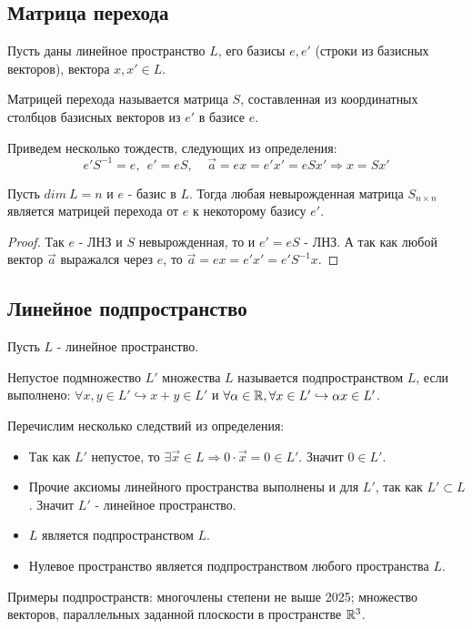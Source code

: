 \subsection{Матрица перехода}
Пусть даны линейное пространство $L$, его базисы $e, e'$ (строки из базисных векторов), вектора $x, x' \in L$.
\begin{definition}
    Матрицей перехода называется матрица $S$, составленная из координатных столбцов базисных векторов из $e'$ в базисе $e$.
\end{definition}
Приведем несколько тождеств, следующих из определения:
\[
    e'S^{-1} =e, \ \ e'=eS, \ \ \ \ \ \vec{a}=ex=e'x'=eSx' \Rightarrow x=Sx' 
\]
\begin{proposition}
    Пусть $dim \ L = n$ и $e$ - базис в $L$. Тогда любая невырожденная матрица $S_{n \times n}$ является матрицей перехода от $e$ к некоторому базису $e'$.
\end{proposition}
\begin{proof}
    Так $e$ - ЛНЗ и $S$ невырожденная, то и $e'=eS$ - ЛНЗ. А так как любой вектор $\vec{a}$ выражался через $e$, то  $\vec{a}=ex=e'x'=e'S^{-1}x$.
\end{proof}
\subsection{Линейное подпространство}
Пусть $L$ - линейное пространство.
\begin{definition}
    Непустое подмножество $L'$ множества $L$ называется подпространством $L$, если выполнено: $\forall x, y \in L' \hookrightarrow x+y\in L'$ и $\forall \alpha \in \mathbb{R}, \forall x \in L' \hookrightarrow \alpha x \in L'$.
\end{definition}
Перечислим несколько следствий из определения:
\begin{itemize}
    \item Так как $L'$ непустое, то $\exists \vec{x}\in L \Rightarrow 0 \cdot \vec{x}=0 \in L'$. Значит $0 \in L'$.
    \item Прочие аксиомы линейного пространства выполнены и для $L'$, так как $L'\subset L$. Значит $L'$ - линейное пространство.
    \item $L$ является подпространством $L$.
    \item Нулевое пространство является подпространством любого пространства $L$.
\end{itemize}
Примеры подпространств: многочлены степени не выше 2025; множество векторов, параллельных заданной плоскости в пространстве $\mathbb{R}^3$.
